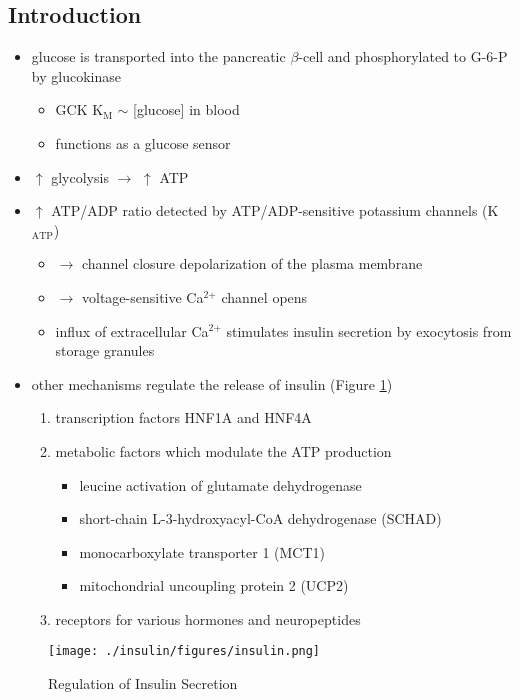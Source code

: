 \documentclass{scrartcl}
\begin{document}
\subsection{Introduction}
\label{sec:org57ec27b}
\begin{itemize}
\item glucose is transported into the pancreatic \(\beta\)-cell and phosphorylated to G-6-P by glucokinase
\begin{itemize}
\item GCK K\(_{\text{M}}\) \(\sim\) [glucose] in blood
\item functions as a glucose sensor
\end{itemize}
\item \(\uparrow\) glycolysis \(\to\) \(\uparrow\) ATP
\item \(\uparrow\) ATP/ADP ratio detected by ATP/ADP-sensitive potassium channels (K\(_{\text{ATP}}\))
\begin{itemize}
\item \(\to\) channel closure depolarization of the plasma membrane
\item \(\to\) voltage-sensitive Ca\(^{\text{2+}}\) channel opens
\item influx of extracellular Ca\(^{\text{2+}}\) stimulates insulin secretion by
exocytosis from storage granules
\end{itemize}

\item other mechanisms regulate the release of insulin (Figure \ref{fig:orgd88fb93})
\begin{enumerate}
\item transcription factors HNF1A and HNF4A
\item metabolic factors which modulate the ATP production
\begin{itemize}
\item leucine activation of glutamate dehydrogenase
\item short-chain L-3-hydroxyacyl-CoA dehydrogenase (SCHAD)
\item monocarboxylate transporter 1 (MCT1)
\item mitochondrial uncoupling protein 2 (UCP2)
\end{itemize}
\item receptors for various hormones and neuropeptides
\end{enumerate}
\end{itemize}



\begin{figure}[htbp]
\centering
\texttt{[image: ./insulin/figures/insulin.png]}
\caption[insulin]{\label{fig:orgd88fb93}
Regulation of Insulin Secretion}
\end{figure}
\end{document}
